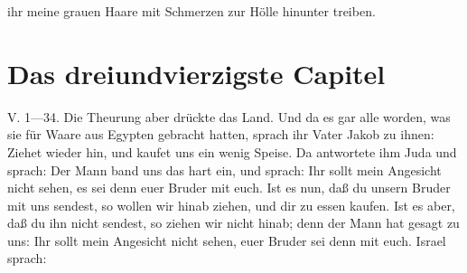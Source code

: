 \begin{schriftzitat}
ihr meine grauen Haare mit Schmerzen zur Hölle hinunter treiben.
\end{schriftzitat}

\section{Das dreiundvierzigste Capitel}

\begin{schriftzitat}
V. 1—34. Die Theurung aber drückte das Land. Und da es gar alle worden, was sie für Waare aus Egypten gebracht hatten, sprach ihr Vater Jakob zu ihnen: Ziehet wieder hin, und kaufet uns ein wenig Speise. Da antwortete ihm Juda und sprach: Der Mann band uns das hart ein, und sprach: Ihr sollt mein Angesicht nicht sehen, es sei denn euer Bruder mit euch. Ist es nun, daß du unsern Bruder mit uns sendest, so wollen wir hinab ziehen, und dir zu essen kaufen. Ist es aber, daß du ihn nicht sendest, so ziehen wir nicht hinab; denn der Mann hat gesagt zu uns: Ihr sollt mein Angesicht nicht sehen, euer Bruder sei denn mit euch. Israel sprach:

\end{schriftzitat}
